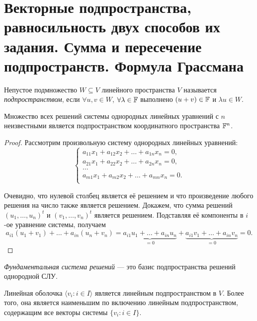 \section{Векторные подпространства, равносильность двух способов их задания. Сумма и пересечение подпространств. Формула Грассмана}

\begin{definition}
    Непустое подмножество $W \subseteq V$ линейного пространства $V$ называется \textit{подпространством}, если $\forall u, v \in W$, $\forall \lambda \in \mathbb{F}$ выполнено $(u + v) \in \mathbb{F}$ и $\lambda u \in W$.
\end{definition}

\begin{proposal}
    Множество всех решений системы однородных линейных уравнений с $n$ неизвестными является подпространством координатного пространства $\mathbb{F}^n$.
\end{proposal}

\begin{proof}
    Рассмотрим произвольную систему однородных линейных уравнений:
    \[
        \begin{cases}
            a_{11}x_1 + a_{12}x_2 + \ldots + a_{1n}x_n = 0,\\
            a_{21}x_1 + a_{22}x_2 + \ldots + a_{2n}x_n = 0,\\
            \ldots\\
            a_{m1}x_1 + a_{m2}x_2 + \ldots + a_{mn}x_n = 0.\\
        \end{cases}
    \]

    Очевидно, что нулевой столбец является её решением и что произведение любого решения на число также является решением. Докажем, что сумма решений $(u_1, \ldots, u_n)^t$ и $(v_1, \ldots, v_n)^t$ является решением. Подставляя её компоненты в $i$-ое уравнение системы, получаем
    \[
        a_{i1}(u_1 + v_1) + \ldots + a_{in}(u_n + v_n) = \underbrace{a_{i1}u_1 + \ldots + a_{in}u_n}_{= 0} + \underbrace{a_{i1}v_1 + \ldots + a_{in}v_n}_{= 0} = 0.
    \]
\end{proof}

\begin{definition}
    \textit{Фундаментальная система решений} --- это базис подпространства решений однородной СЛУ.
\end{definition}

\begin{proposal}
    Линейная оболочка $\langle v_i : i \in I \rangle$ является линейным подпространством в $V$. Более того, она является наименьшим по включению линейным подпространством, содержащим все векторы системы $\{v_i : i \in I\}$.
\end{proposal}

